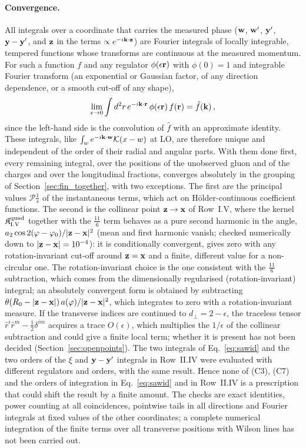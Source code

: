 \paragraph{Convergence.} All integrals over a coordinate that carries the measured phase ($\mathbf{w}$, $\mathbf{w}'$, $\mathbf{y}'$, $\mathbf{y}-\mathbf{y}'$, and $\mathbf{z}$ in the terms $\propto e^{-i\mathbf{k}\cdot\mathbf{z}}$) are Fourier integrals of locally integrable, tempered functions whose transforms are continuous at the measured momentum. For such a function $f$ and any regulator $\phi(\epsilon\mathbf{r})$ with $\phi(0)=1$ and integrable Fourier transform (an exponential or Gaussian factor, of any direction dependence, or a smooth cut-off of any shape),
\begin{align}\label{eq:FTlemma}
\lim_{\epsilon\to0}\int d^2r\,e^{-i\mathbf{k}\cdot\mathbf{r}}\,\phi(\epsilon\mathbf{r})\,f(\mathbf{r})=\hat f(\mathbf{k})\,,
\end{align}
since the left-hand side is the convolution of $\hat f$ with an approximate identity. These integrals, like $\int_we^{-i\mathbf{k}\cdot\mathbf{w}}\mathcal{K}(x-w)$ at LO, are therefore unique and independent of the order of their radial and angular parts. With them done first, every remaining integral, over the positions of the unobserved gluon and of the charges and over the longitudinal fractions, converges absolutely in the grouping of Section~\ref{sec:fin_together}, with two exceptions. The first are the principal values $\mathcal P\frac1s$ of the instantaneous terms, which act on H\"older-continuous coefficient functions. The second is the collinear point $\mathbf{z}\to\mathbf{x}$ of Row~I.V, where the kernel $\mathfrak K^{\rm quad}_{\rm I.V}$ together with the $\frac{11}{6}$ term behaves as a pure second harmonic in the angle, $a_2\cos2(\varphi-\varphi_0)/|\mathbf{z}-\mathbf{x}|^2$ (mean and first harmonic vanish; checked numerically down to $|\mathbf{z}-\mathbf{x}|=10^{-4}$): it is conditionally convergent, gives zero with any rotation-invariant cut-off around $\mathbf{z}=\mathbf{x}$ and a finite, different value for a non-circular one. The rotation-invariant choice is the one consistent with the $\frac{11}{6}$ subtraction, which comes from the dimensionally regularised (rotation-invariant) integral; an absolutely convergent form is obtained by subtracting $\theta(R_0-|\mathbf{z}-\mathbf{x}|)\,a(\varphi)/|\mathbf{z}-\mathbf{x}|^2$, which integrates to zero with a rotation-invariant measure. If the transverse indices are continued to $d_\perp=2-\epsilon$, the traceless tensor $\hat r^i\hat r^m-\frac12\delta^{im}$ acquires a trace $O(\epsilon)$, which multiplies the $1/\epsilon$ of the collinear subtraction and could give a finite local term; whether it is present has not been decided (Section~\ref{sec:openpoints}). The two integrals of Eq.~\eqref{eq:sawid} and the two orders of the $\xi$ and $\mathbf{y}-\mathbf{y}'$ integrals in Row~II.IV were evaluated with different regulators and orders, with the same result. Hence none of (C3), (C7) and the orders of integration in Eq.~\eqref{eq:sawid} and in Row~II.IV is a prescription that could shift the result by a finite amount. The checks are exact identities, power counting at all coincidences, pointwise tails in all directions and Fourier integrals at fixed values of the other coordinates; a complete numerical integration of the finite terms over all transverse positions with Wilson lines has not been carried out.

